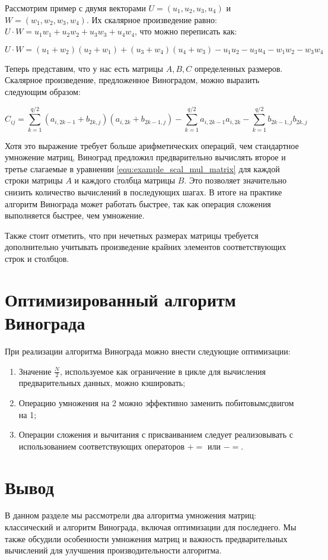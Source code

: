 Рассмотрим пример с двумя векторами $U = (u_1, u_2, u_3, u_4)$ и $W = (w_1, w_2, w_3, w_4)$. 
Их скалярное произведение равно: $U \cdot W = u_1w_1 + u_2w_2 + u_3w_3 + u_4w_4$, что можно переписать как:

\begin{equation}
\label{equ:example_scal_mul}
U \cdot W = (u_1 + w_2)(u_2 + w_1) + (u_3 + w_4)(u_4 + w_3) - u_1u_2 - u_3u_4 - w_1w_2 - w_3w_4
\end{equation}

Теперь представим, что у нас есть матрицы $A, B, C$ определенных размеров. 
Скалярное произведение, предложенное Виноградом, можно выразить следующим образом:

\begin{equation}
\label{equ:example_scal_mul_matrix}
C_{ij} = \sum_{k=1}^{q/2}(a_{i,2k-1} + b_{2k,j})(a_{i,2k} + b_{2k-1,j}) - \sum_{k=1}^{q/2} a_{i,2k-1}a_{i,2k} - \sum_{k=1}^{q/2} b_{2k-1,j}b_{2k,j}
\end{equation}

Хотя это выражение требует больше арифметических операций, чем стандартное умножение матриц, Виноград предложил предварительно вычислять второе и третье слагаемые в уравнении \ref{equ:example_scal_mul_matrix} для каждой строки матрицы $A$ и каждого столбца матрицы $B$. 
Это позволяет значительно снизить количество вычислений в последующих шагах. 
В итоге на практике алгоритм Винограда может работать быстрее, так как операция сложения выполняется быстрее, чем умножение.

Также стоит отметить, что при нечетных размерах матрицы требуется дополнительно учитывать произведение крайних элементов соответствующих строк и столбцов.

\section{Оптимизированный алгоритм Винограда}

При реализации алгоритма Винограда можно внести следующие оптимизации:

\begin{enumerate}
\item Значение $\frac{N}{2}$, используемое как ограничение в цикле для вычисления предварительных данных, можно кэшировать;
\item Операцию умножения на 2 можно эффективно заменить побитовым\newpage сдвигом на 1;
\item Операции сложения и вычитания с присваиванием следует реализовывать с использованием соответствующих операторов $+=$ или $-=$.
\end{enumerate}

\section*{Вывод}

В данном разделе мы рассмотрели два алгоритма умножения матриц: классический и алгоритм Винограда, включая оптимизации для последнего. 
Мы также обсудили особенности умножения матриц и важность предварительных вычислений для улучшения производительности алгоритма.